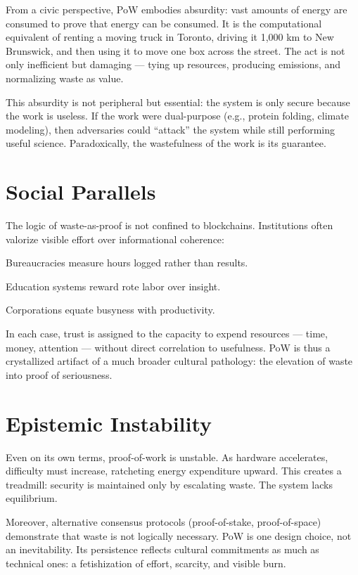 \documentclass{book}
\begin{document}
From a civic perspective, PoW embodies absurdity: vast amounts of energy are consumed to prove that energy can be consumed. It is the computational equivalent of renting a moving truck in Toronto, driving it 1,000 km to New Brunswick, and then using it to move one box across the street. The act is not only inefficient but damaging — tying up resources, producing emissions, and normalizing waste as value.

This absurdity is not peripheral but essential: the system is only secure because the work is useless. If the work were dual-purpose (e.g., protein folding, climate modeling), then adversaries could ``attack'' the system while still performing useful science. Paradoxically, the wastefulness of the work is its guarantee.

\section{Social Parallels}

The logic of waste-as-proof is not confined to blockchains. Institutions often valorize visible effort over informational coherence:

Bureaucracies measure hours logged rather than results.

Education systems reward rote labor over insight.

Corporations equate busyness with productivity.

In each case, trust is assigned to the capacity to expend resources — time, money, attention — without direct correlation to usefulness. PoW is thus a crystallized artifact of a much broader cultural pathology: the elevation of waste into proof of seriousness.

\section{Epistemic Instability}

Even on its own terms, proof-of-work is unstable. As hardware accelerates, difficulty must increase, ratcheting energy expenditure upward. This creates a treadmill: security is maintained only by escalating waste. The system lacks equilibrium.

Moreover, alternative consensus protocols (proof-of-stake, proof-of-space) demonstrate that waste is not logically necessary. PoW is one design choice, not an inevitability. Its persistence reflects cultural commitments as much as technical ones: a fetishization of effort, scarcity, and visible burn.
\end{document}
